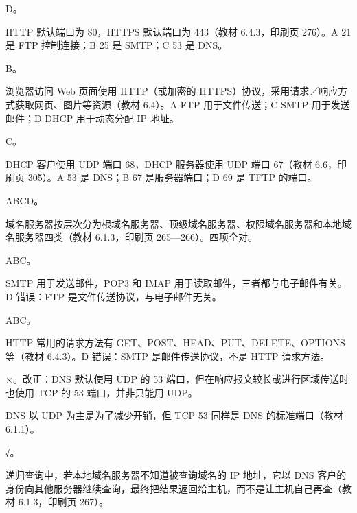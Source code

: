 \documentclass[a4paper,11pt]{article}
\begin{document}
\q D。\begin{analysis}HTTP 默认端口为 80，HTTPS 默认端口为 443（教材 6.4.3，印刷页 276）。A 21 是 FTP 控制连接；B 25 是 SMTP；C 53 是 DNS。\end{analysis}

\q B。\begin{analysis}浏览器访问 Web 页面使用 HTTP（或加密的 HTTPS）协议，采用请求／响应方式获取网页、图片等资源（教材 6.4）。A FTP 用于文件传送；C SMTP 用于发送邮件；D DHCP 用于动态分配 IP 地址。\end{analysis}

\q C。\begin{analysis}DHCP 客户使用 UDP 端口 68，DHCP 服务器使用 UDP 端口 67（教材 6.6，印刷页 305）。A 53 是 DNS；B 67 是服务器端口；D 69 是 TFTP 的端口。\end{analysis}


\q ABCD。\begin{analysis}域名服务器按层次分为根域名服务器、顶级域名服务器、权限域名服务器和本地域名服务器四类（教材 6.1.3，印刷页 265—266）。四项全对。\end{analysis}

\q ABC。\begin{analysis}SMTP 用于发送邮件，POP3 和 IMAP 用于读取邮件，三者都与电子邮件有关。D 错误：FTP 是文件传送协议，与电子邮件无关。\end{analysis}

\q ABC。\begin{analysis}HTTP 常用的请求方法有 GET、POST、HEAD、PUT、DELETE、OPTIONS 等（教材 6.4.3）。D 错误：SMTP 是邮件传送协议，不是 HTTP 请求方法。\end{analysis}


\q ×。改正：DNS 默认使用 UDP 的 53 端口，但在响应报文较长或进行区域传送时也使用 TCP 的 53 端口，并非只能用 UDP。\begin{analysis}DNS 以 UDP 为主是为了减少开销，但 TCP 53 同样是 DNS 的标准端口（教材 6.1.1）。\end{analysis}

\q √。\begin{analysis}递归查询中，若本地域名服务器不知道被查询域名的 IP 地址，它以 DNS 客户的身份向其他服务器继续查询，最终把结果返回给主机，而不是让主机自己再查（教材 6.1.3，印刷页 267）。\end{analysis}
\end{document}
